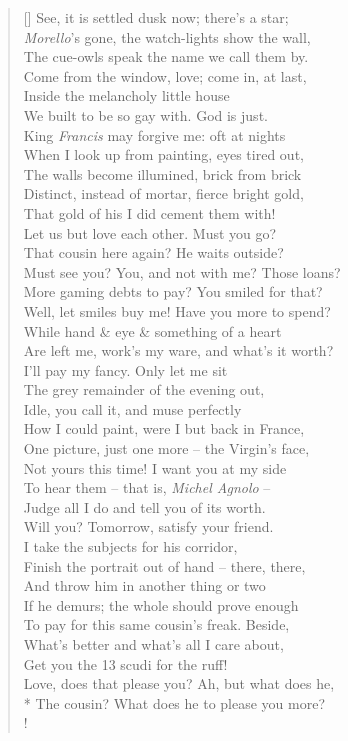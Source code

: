 \documentclass[MAIN]{subfiles}
\begin{document}
\begin{verse}[\versewidth]
See, it is settled dusk now; there's a star;\\
\emph{Morello}'s gone, the watch-lights show the wall,\\
The cue-owls speak the name we call them by.\\
Come from the window, love; come in, at last,\\
Inside the melancholy little house\\
We built to be so gay with. God is just.\\
King \emph{Francis} may forgive me: oft at nights\\ 
When I look up from painting, eyes tired out,\\
The walls become illumined, brick from brick\\
Distinct, instead of mortar, fierce bright gold,\\
That gold of his I did cement them with!\\
Let us but love each other. Must you go?\\
That cousin here again? He waits outside?\\
Must see you? You, and not with me? Those loans?\\
More gaming debts to pay? You smiled for that?\\
Well, let smiles buy me! Have you more to spend?\\
While hand \& eye \& something of a heart\\
Are left me, work's my ware, and what's it worth?\\
I'll pay my fancy. Only let me sit\\
The grey remainder of the evening out,\\
Idle, you call it, and muse perfectly\\
How I could paint, were I but back in France,\\
One picture, just one more -- the Virgin's face,\\
Not yours this time! I want you at my side\\
To hear them -- that is, \emph{Michel Agnolo} --\\
Judge all I do and tell you of its worth.\\ 
Will you? Tomorrow, satisfy your friend.\\
I take the subjects for his corridor,\\
Finish the portrait out of hand -- there, there,\\
And throw him in another thing or two\\
If he demurs; the whole should prove enough\\
To pay for this same cousin's freak. Beside,\\
What's better and what's all I care about,\\
Get you the 13 {\hge scudi} for the ruff!\\
Love, does that please you? Ah, but what does he,\\*
The cousin? What does he to please you more?\\!


\end{verse}
\end{document}
